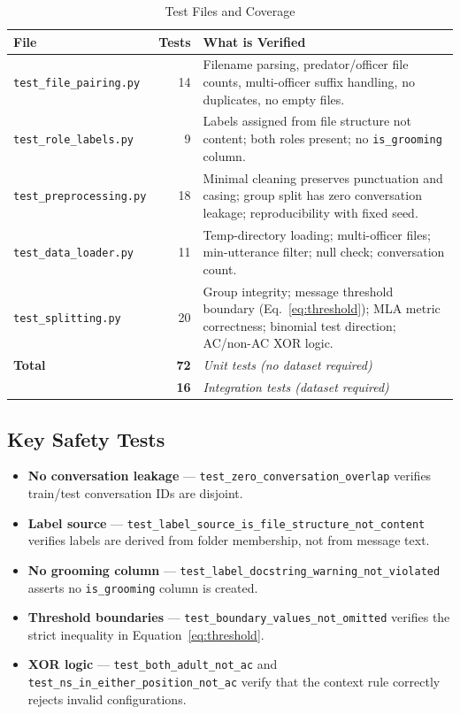 \documentclass[12pt,a4paper]{article}
\begin{document}
\begin{table}[H]
  \centering
  \caption{Test Files and Coverage}
  \begin{tabularx}{\linewidth}{lrX}
    \toprule
    \textbf{File} & \textbf{Tests} & \textbf{What is Verified} \\
    \midrule
    \texttt{test\_file\_pairing.py}   & 14 &
      Filename parsing, predator/officer file counts, multi-officer
      suffix handling, no duplicates, no empty files. \\
    \addlinespace
    \texttt{test\_role\_labels.py}    &  9 &
      Labels assigned from file structure not content; both roles
      present; no \texttt{is\_grooming} column. \\
    \addlinespace
    \texttt{test\_preprocessing.py}  & 18 &
      Minimal cleaning preserves punctuation and casing; group split
      has zero conversation leakage; reproducibility with fixed seed. \\
    \addlinespace
    \texttt{test\_data\_loader.py}   & 11 &
      Temp-directory loading; multi-officer files; min-utterance filter;
      null check; conversation count. \\
    \addlinespace
    \texttt{test\_splitting.py}      & 20 &
      Group integrity; message threshold boundary (Eq.~\ref{eq:threshold});
      MLA metric correctness; binomial test direction; AC/non-AC XOR logic. \\
    \midrule
    \textbf{Total} & \textbf{72} & \emph{Unit tests (no dataset required)} \\
    & \textbf{16} & \emph{Integration tests (dataset required)} \\
    \bottomrule
  \end{tabularx}
  \label{tab:tests}
\end{table}

\subsection{Key Safety Tests}

\begin{itemize}[leftmargin=*]
  \item \textbf{No conversation leakage} --- \texttt{test\_zero\_conversation\_overlap}
        verifies train/test conversation IDs are disjoint.
  \item \textbf{Label source} ---
        \texttt{test\_label\_source\_is\_file\_structure\_not\_content}
        verifies labels are derived from folder membership, not from message
        text.
  \item \textbf{No grooming column} ---
        \texttt{test\_label\_docstring\_warning\_not\_violated} asserts
        no \texttt{is\_grooming} column is created.
  \item \textbf{Threshold boundaries} ---
        \texttt{test\_boundary\_values\_not\_omitted} verifies the strict
        inequality in Equation~\ref{eq:threshold}.
  \item \textbf{XOR logic} ---
        \texttt{test\_both\_adult\_not\_ac} and
        \texttt{test\_ns\_in\_either\_position\_not\_ac} verify that the
        context rule correctly rejects invalid configurations.
\end{itemize}
\end{document}
